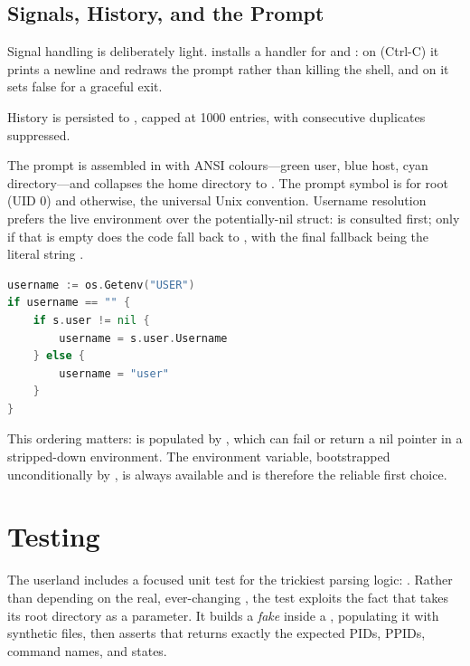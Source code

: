 \subsection{Signals, History, and the Prompt}

Signal handling is deliberately light.  installs a handler for
 and : on  (Ctrl-C) it prints a newline
and redraws the prompt rather than killing the shell, and on  it
sets  false for a graceful exit.

History is persisted to , capped at 1000
entries, with consecutive duplicates suppressed.

The prompt is assembled in  with ANSI colours---green user,
blue host, cyan directory---and collapses the home directory to \code{\~}. The
prompt symbol is \code{\#} for root (UID 0) and \code{\$} otherwise, the
universal Unix convention. Username resolution prefers the live environment over
the potentially-nil  struct:  is consulted
first; only if that is empty does the code fall back to ,
with the final fallback being the literal string .

\begin{lstlisting}[language=Go, caption={Prompt username resolution (shell/shell.go)}]
username := os.Getenv("USER")
if username == "" {
    if s.user != nil {
        username = s.user.Username
    } else {
        username = "user"
    }
}
\end{lstlisting}

This ordering matters:  is populated by ,
which can fail or return a nil pointer in a stripped-down environment. The
environment variable, bootstrapped unconditionally by , is always
available and is therefore the reliable first choice.

\section{Testing}
\label{sec:userland-testing}

The userland includes a focused unit test for the trickiest parsing logic:
. Rather than depending on the real, ever-changing
, the test exploits the fact that  takes its root
directory as a parameter. It builds a \emph{fake}  inside a
, populating it with synthetic  files, then asserts
that  returns exactly the expected PIDs, PPIDs, command names, and
states.

